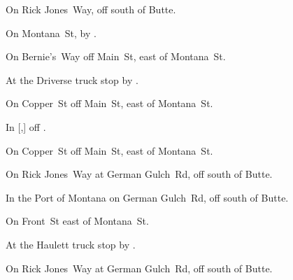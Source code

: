 

\begin{LocationList}

On Rick Jones~Way, off   south of Butte.

On Montana~St, by   .

On Bernie's~Way off Main~St, east of Montana~St.

At the Driverse truck stop by   .

On Copper~St off Main~St, east of Montana~St.

In [,] off  .

On Copper~St off Main~St, east of Montana~St.

On Rick Jones~Way at German Gulch~Rd, off   south of Butte.

In the Port of Montana on German Gulch~Rd, off   south of Butte.

On Front~St east of Montana~St.

\Location{\TruckService \Service \Gas \Rest}
At the Haulett truck stop by   .

On Rick Jones~Way at German Gulch~Rd, off   south of Butte.

\end{LocationList}
